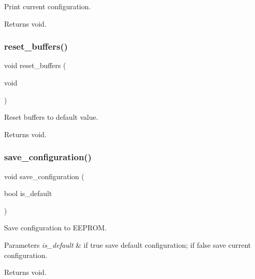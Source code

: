 Print current configuration. 

\begin{DoxyReturn}{Returns}
void. 
\end{DoxyReturn}
\mbox{\label{i2c-rain_8ino_a07daf3835b622d4d3451690f603845c1}} 
\subsubsection{\texorpdfstring{reset\+\_\+buffers()}{reset\_buffers()}}
{\footnotesize\ttfamily void reset\+\_\+buffers (\begin{DoxyParamCaption}\item[{void}]{ }\end{DoxyParamCaption})}



Reset buffers to default value. 

\begin{DoxyReturn}{Returns}
void. 
\end{DoxyReturn}
\mbox{\label{i2c-rain_8ino_afa979a8cb238fe81bf20654dfd6096ef}} 
\subsubsection{\texorpdfstring{save\+\_\+configuration()}{save\_configuration()}}
{\footnotesize\ttfamily void save\+\_\+configuration (\begin{DoxyParamCaption}\item[{bool}]{is\+\_\+default }\end{DoxyParamCaption})}



Save configuration to E\+E\+P\+R\+OM. 


\begin{DoxyParams}{Parameters}
{\em is\+\_\+default} & if true save default configuration; if false save current configuration. \\
\hline
\end{DoxyParams}
\begin{DoxyReturn}{Returns}
void. 
\end{DoxyReturn}
\mbox{\label{i2c-rain_8ino_a368e45fb147aecb0fd1478d3cc76fba7}} 

